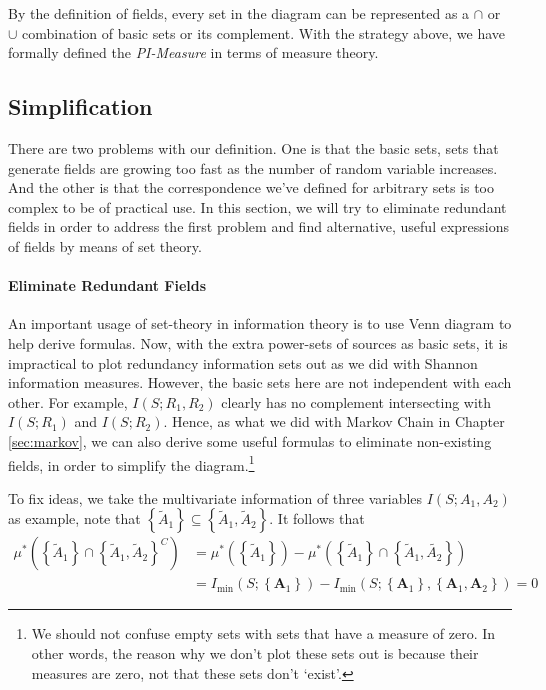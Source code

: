 By the definition of fields, every set in the diagram can be represented as a $\cap$ or $\cup$ combination of basic sets or its complement. With the strategy above, we have formally defined the \textit{PI-Measure} in terms of measure theory. 



\subsection{Simplification}

There are two problems with our definition. One is that the basic sets, sets that generate fields are growing too fast as the number of random variable increases. And the other is that the correspondence we've defined for arbitrary sets is too complex to be of practical use. In this section, we will try to eliminate redundant fields in order to address the first problem and find alternative, useful expressions of fields by means of set theory.

\paragraph{Eliminate Redundant Fields} An important usage of set-theory in information theory is to use Venn diagram to help derive formulas. Now, with the extra power-sets of sources as basic sets, it is impractical to plot redundancy information sets out as we did with Shannon information measures. However, the basic sets here are not independent with each other. For example, $I(S;R_1,R_2)$ clearly has no complement intersecting with $I(S;R_1)$ and $I(S;R_2)$. Hence, as what we did with Markov Chain in Chapter \ref{sec:markov}, we can also derive some useful formulas to eliminate non-existing fields, in order to simplify the diagram.\footnote{We should not confuse empty sets with sets that have a measure of zero. In other words, the reason why we don't plot these sets out is because their measures are zero, not that these sets don't `exist'.}

To fix ideas, we take the multivariate information of three variables $I(S;{A}_1, {A}_2)$ as example, note that $\left\{ \tilde{A}_1 \right\} \subseteq \left\{\tilde{A}_1, \tilde{A}_2 \right\}$. It follows that 
\begin{equation}
\begin{aligned}
    \mu^{*}\left( \left\{ \tilde{A}_1 \right\} \cap \left\{\tilde{A}_1, \tilde{A}_2 \right\}^{C} \right) &= \mu^{*}\left( \left\{\tilde{A}_1\right\}\right)  - \mu^{*}\left(\left\{\tilde{A}_1 \right\}\cap  \left\{  \tilde{A}_1, \tilde{A_2} \right \} \right) \\
    &= I_{\min} \left( S; \left\{\mathbf{A}_1 \right\} \right) - I_{\min} \left( S; \left\{ \mathbf{A}_1 \right\} ,\left\{ \mathbf{A}_1, \mathbf{A}_2 \right\} \right) = 0
\end{aligned}
\label{eqn:fieldelim}
\end{equation}

